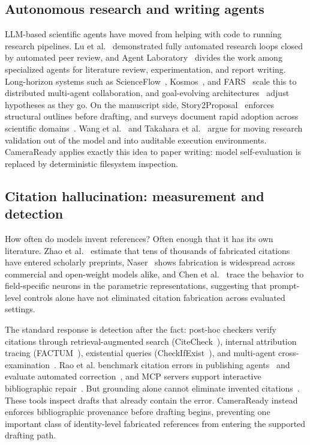 \documentclass[conference]{IEEEtran}
\begin{document}
\subsection{Autonomous research and writing agents}
LLM-based scientific agents have moved from helping with code to running research pipelines. Lu et al.~\cite{lu2024the} demonstrated fully automated research loops closed by automated peer review, and Agent Laboratory~\cite{schmidgall2025agent} divides the work among specialized agents for literature review, experimentation, and report writing. Long-horizon systems such as ScienceFlow~\cite{zhao2026scienceflow}, Kosmos~\cite{mitchener2025kosmos}, and FARS~\cite{tang2026fars} scale this to distributed multi-agent collaboration, and goal-evolving architectures~\cite{du2025accelerating} adjust hypotheses as they go. On the manuscript side, Story2Proposal~\cite{qian2026story2proposal} enforces structural outlines before drafting, and surveys document rapid adoption across scientific domains~\cite{ren2025towards,tie2025a,kong2026ai}. Wang et al.~\cite{wang2026externalizing} and Takahara et al.~\cite{takahara2026toward} argue for moving research validation out of the model and into auditable execution environments. CameraReady applies exactly this idea to paper writing: model self-evaluation is replaced by deterministic filesystem inspection.

\subsection{Citation hallucination: measurement and detection}
How often do models invent references? Often enough that it has its own literature. Zhao et al.~\cite{zhao2026llm} estimate that tens of thousands of fabricated citations have entered scholarly preprints, Naser~\cite{naser2026how} shows fabrication is widespread across commercial and open-weight models alike, and Chen et al.~\cite{chen2026where} trace the behavior to field-specific neurons in the parametric representations, suggesting that prompt-level controls alone have not eliminated citation fabrication across evaluated settings.

The standard response is detection after the fact: post-hoc checkers verify citations through retrieval-augmented search (CiteCheck~\cite{khajavi2026citecheck}), internal attribution tracing (FACTUM~\cite{dassen2026factum}), existential queries (CheckIfExist~\cite{abbonato2026checkifexist}), and multi-agent cross-examination~\cite{li2026source}. Rao et al. benchmark citation errors in publishing agents~\cite{rao2026bibtex} and evaluate automated correction~\cite{rao2026detecting}, and MCP servers support interactive bibliographic repair~\cite{lee2026citecheck}. But grounding alone cannot eliminate invented citations~\cite{bchard2024reducing}. These tools inspect drafts that already contain the error. CameraReady instead enforces bibliographic provenance before drafting begins, preventing one important class of identity-level fabricated references from entering the supported drafting path.
\end{document}
